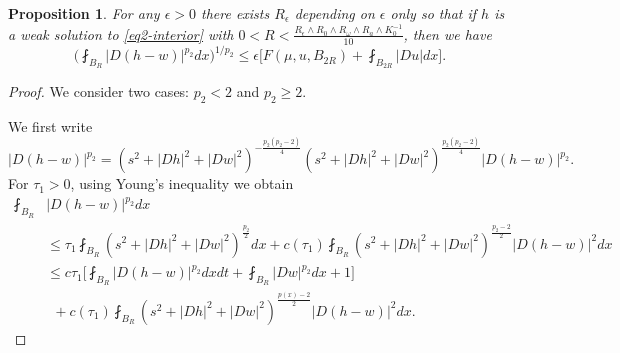\documentclass[a4paper,10pt]{amsart}
\newtheorem{prop}[thm]{Proposition}
\newcommand{\px}{p(x)}
\newcommand{\f}{\frac}
\newcommand{\om}{\omega}
\begin{document}
\begin{prop}
	\label{prop2-inter}
	For any $\epsilon>0$ there exists $R_\epsilon$ depending on $\epsilon$ only so that  if $h$ is a weak solution to \eqref{eq2-interior} with $0<R<\f{R_\epsilon\wedge R_0\wedge R_\om\wedge R_a \wedge K_0^{-1}}{10}$, then we have
	\begin{equation}
	\label{eq-prop2}
	\Big(\fint_{B_R}|D(h-w)|^{p_2}dx\Big)^{1/p_2}\leq \epsilon  \Big[F(\mu,u,B_{2R})+\fint_{B_{2R}}|Du|dx\Big]. 
	\end{equation}
\end{prop}
\begin{proof}
	We consider two cases: $p_2< 2$ and $p_2\geq 2$.
	
	 We first write
	$$
	|D(h-w)|^{p_2}= (s^2+|Dh|^2+|Dw|^2)^{-\f{p_2(p_2-2)}{4}}(s^2+|Dh|^2+|Dw|^2)^{\f{p_2(p_2-2)}{4}}|D(h-w)|^{p_2}.
	$$
	For $\tau_1>0$, using Young's inequality we obtain
	\begin{equation}\label{eq1-proof prop1 inter}
	\begin{aligned}
	\fint_{B_R}&|D(h-w)|^{p_2} dx\\
	&\leq \tau_1\fint_{B_{R}}(s^2+|Dh|^2+|Dw|^2)^{\f{p_2}{2}} dx + c(\tau_1)\fint_{B_{R}}(s^2+|Dh|^2+|Dw|^2)^{\f{p_2-2}{2}}|D(h-w)|^2dx\\
	&\leq c\tau_1\Big[\fint_{B_{R}}|D(h-w)|^{p_2}dxdt +\fint_{B_{R}}|Dw|^{p_2}dx +1\Big]\\
	& \ \ + c(\tau_1)\fint_{B_{R}}(s^2+|Dh|^2+|Dw|^2)^{\f{\px-2}{2}}|D(h-w)|^2dx.
	\end{aligned}
	\end{equation}
	

\end{proof}
\end{document}
